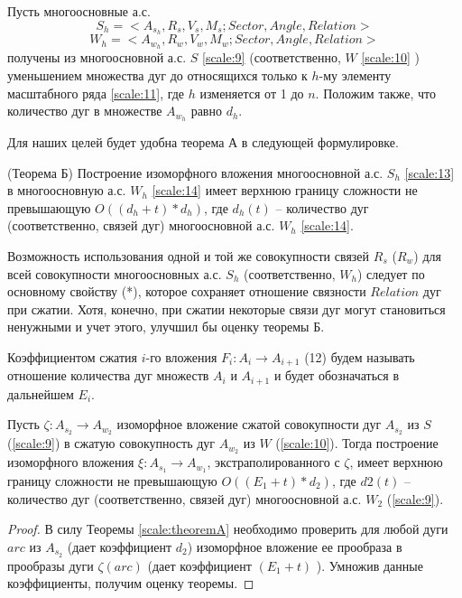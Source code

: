 Пусть  многоосновные  а.с.  
\begin{equation}
S_h =< A_{s_h}, R_s, V_s, M_s; Sector, Angle, Relation>
\label{scale:13}
\end{equation}
\begin{equation}
W_h = < A_{w_h}, R_w, V_w, M_w; Sector,  Angle, Relation>
\label{scale:14}
\end{equation}
получены из многоосновной  а.с. $S$ \ref{scale:9} (соответственно,  $W$ \ref{scale:10} ) уменьшением множества дуг до  относящихся только к $h$-му элементу   масштабного ряда \ref{scale:11},  где  $h$  изменяется  от 1  до  $n$.  Положим также, что количество дуг в множестве  $A_{w_h}$ равно $d_h$.

\noindent
Для наших целей будет удобна  теорема  А в следующей формулировке.	
\begin{theorem}
(Теорема Б) Построение изоморфного  вложения  многоосновной  а.с. $S_h$ \ref{scale:13} в многоосновную  а.с. $W_h$  \ref{scale:14} имеет верхнюю границу сложности не превышающую $O((d_h + t)* d_h)$,  где  $d_h(t)$ – количество дуг (соответственно, связей дуг) многоосновной  а.с. $W_h$ \ref{scale:14}.
\label{scale:theoremB}
\end{theorem}

\begin{remark}
Возможность использования  одной и той же совокупности связей $R_s$ ($R_w$) для всей совокупности  многоосновных  а.с. $S_h$ (соответственно, $W_h$) следует по основному свойству (*),  которое сохраняет  отношение связности $Relation$ дуг при сжатии.  Хотя, конечно, при сжатии некоторые связи дуг могут становиться ненужными и учет этого, улучшил бы  оценку теоремы  Б.   
\end{remark}

\begin{definition}
Коэффициентом сжатия $i$-го  вложения $F_i : A_i \to A_{i+1}$ (12) будем называть отношение количества дуг множеств $A_i$ и $A_{i+1}$ и будет обозначаться в дальнейшем $E_i$.  
\end{definition}

\begin{theorem}
Пусть  $\zeta : A_{s_2} \to A_{w_2}$  изоморфное вложение сжатой совокупности дуг $A_{s_2}$  из $S$ (\ref{scale:9}) в  сжатую  совокупность дуг $A_{w_2}$ из  $W$ (\ref{scale:10}). Тогда  построение изоморфного вложения  $\xi : A_{s_1} \to A_{w_1}$,   экстраполированного с  $\zeta$, имеет верхнюю границу сложности не превышающую $O((E_1 + t)* d_2)$,  где  $d2(t)$ – количество дуг (соответственно, связей дуг) многоосновной  а.с. $W_2$ (\ref{scale:9}).
\end{theorem}
\begin{proof}
В силу Теоремы \ref{scale:theoremA} необходимо проверить для любой дуги  $arc$  из $A_{s_2}$  (дает коэффициент $d_2$) изоморфное вложение  ее прообраза  в  прообразы дуги $\zeta(arc)$ (дает коэффициент  $(E_1 + t)$ ). Умножив данные коэффициенты,  получим оценку теоремы.                        
\end{proof}           

